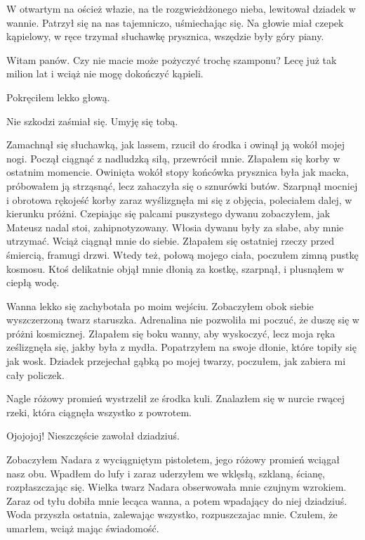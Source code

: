 W otwartym na oścież włazie, na tle rozgwieżdżonego nieba, lewitował dziadek w wannie.
Patrzył się na nas tajemniczo, uśmiechając się. Na głowie miał czepek kąpielowy, w ręce trzymał słuchawkę prysznica, wszędzie były góry piany.
\begin{dialogue}
\ds{} Witam panów. Czy nie macie może pożyczyć trochę szamponu? Lecę już tak milion lat i wciąż nie mogę dokończyć kąpieli.
\end{dialogue}
Pokręciłem lekko głową.
\begin{dialogue}
\ds{} Nie szkodzi \dm{} zaśmiał się. \dm{} Umyję się tobą.
\end{dialogue}
Zamachnął się słuchawką, jak lassem, rzucił do środka i owinął ją wokół mojej nogi.
Począł ciągnąć z nadludzką siłą, przewrócił mnie. Złapałem się korby w ostatnim momencie.
Owinięta wokół stopy końcówka prysznica była jak macka, próbowałem ją strząsnąć, lecz zahaczyła się o sznurówki butów.
Szarpnął mocniej i obrotowa rękojeść korby zaraz wyślizgnęła mi się z objęcia, poleciałem dalej, w kierunku próżni.
Czepiając się palcami puszystego dywanu zobaczyłem, jak Mateusz nadal stoi, zahipnotyzowany.
Włosia dywanu były za słabe, aby mnie utrzymać. Wciąż ciągnął mnie do siebie. Złapałem się ostatniej rzeczy przed śmiercią, framugi drzwi.
Wtedy też, połową mojego ciała, poczułem zimną pustkę kosmosu.
Ktoś delikatnie objął mnie dłonią za kostkę, szarpnął, i plusnąłem w ciepłą wodę.

Wanna lekko się zachybotała po moim wejściu.
Zobaczyłem obok siebie wyszczerzoną twarz staruszka.
Adrenalina nie pozwoliła mi poczuć, że duszę się w próżni kosmicznej.
Złapałem się boku wanny, aby wyskoczyć, lecz moja ręka ześlizgnęła się, jakby była z mydła.
Popatrzyłem na swoje dłonie, które topiły się jak wosk.
Dziadek przejechał gąbką po mojej twarzy, poczułem, jak zabiera mi cały policzek.

Nagle różowy promień wystrzelił ze środka kuli.
Znalazłem się w nurcie rwącej rzeki, która ciągnęła wszystko z powrotem.
\begin{dialogue}
\ds{} Ojojojoj! Nieszczęście \dm{} zawołał dziadziuś.
\end{dialogue}
Zobaczyłem Nadara z wyciągniętym pistoletem, jego różowy promień wciągał nasz obu. Wpadłem do lufy i zaraz uderzyłem we wklęsłą, szklaną, ścianę, rozpłaszczając się.
Wielka twarz Nadara obserwowała mnie czujnym wzrokiem.
Zaraz od tyłu dobiła mnie lecąca wanna, a potem wpadający do niej dziadziuś.
Woda przyszła ostatnia, zalewając wszystko, rozpuszczajac mnie.
Czułem, że umarłem, wciąż mając świadomość.

